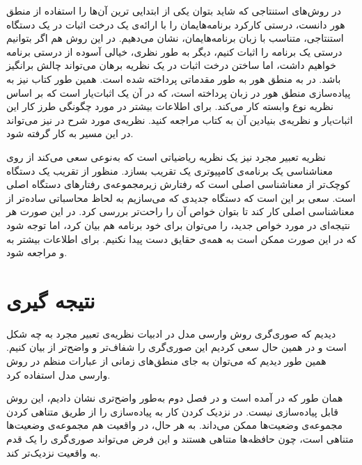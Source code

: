 \documentclass[12pt]{report}
\begin{document}
در روش‌های استنتاجی که شاید بتوان یکی از ابتدایی ترین آن‌ها را استفاده از منطق هور\cite{hoare} دانست، درستی کارکرد برنامه‌هایمان را با ارائه‌ی یک درخت اثبات در یک دستگاه استنتاجی، متناسب با زبان برنامه‌هایمان، نشان می‌‌دهیم. در این روش هم اگر بتوانیم درستی یک برنامه را اثبات کنیم، دیگر به‌ طور نظری، خیالی آسوده از درستی برنامه خواهیم داشت، اما ساختن درخت اثبات در یک نظریه برهان می‌تواند چالش بر‌انگیز باشد. در\cite{logicincs} به منطق هور به طور مقدماتی پرداخته شده است. همین ‌طور کتاب\cite{softwarefoundations} نیز به پیاده‌سازی منطق هور در زبان  پرداخته است، که در آن  یک اثبات‌یار است که بر اساس نظریه نوع وابسته کار می‌کند. برای اطلاعات بیشتر در مورد چگونگی طرز کار این اثبات‌یار و نظریه‌ی بنیادین آن به کتاب\cite{chlipala} مراجعه‌ کنید. نظریه‌ی مورد شرح در\cite{dynamic} نیز می‌تواند در این مسیر به کار گرفته شود.

نظریه تعبیر مجرد\cite{cousot1} نیز یک نظریه ریاضیاتی است که به‌نوعی سعی می‌کند از روی معناشناسی یک برنامه‌ی کامپیوتری\cite{winskel} یک تقریب بسازد. منظور از تقریب یک دستگاه کوچک‌تر از معناشناسی اصلی است که رفتارش زیرمجموعه‌ی رفتارهای دستگاه اصلی است. سعی بر این است که دستگاه جدیدی که می‌سازیم به لحاظ محاسباتی ساده‌تر از معناشناسی اصلی کار کند تا بتوان خواص آن را راحت‌تر بررسی کرد. در این صورت هر نتیجه‌ای در مورد خواص جدید، را می‌توان برای خود برنامه هم بیان کرد، اما توجه شود که در این صورت ممکن است به همه‌ی حقایق دست پیدا نکنیم. برای اطلاعات بیشتر به \cite{cousotbook} و \cite{statica} مراجعه شود.



\tableofcontents







\chapter*{نتیجه گیری}
دیدیم که صوری‌گری روش وارسی مدل در ادبیات نظریه‌ی تعبیر مجرد به چه شکل است و در همین حال سعی کردیم این صوری‌گری را شفاف‌تر و واضح‌تر از \cite{calcul} بیان کنیم. همین طور دیدیم که می‌توان به‌ جای منطق‌های زمانی از عبارات منظم در روش وارسی مدل استفاده کرد.

همان طور که در \cite{calcul} آمده است و در فصل دوم به‌طور واضح‌تری نشان دادیم، این روش قابل پیاده‌سازی نیست. در \cite{calcul} نزدیک کردن کار به پیاده‌سازی را از طریق متناهی کردن مجموعه‌ی وضعیت‌ها ممکن می‌‌داند. به ‌هر حال، در واقعیت هم مجموعه‌ی وضعیت‌ها متناهی است، چون حافظه‌ها متناهی هستند و این فرض می‌تواند صوری‌گری را یک قدم به واقعیت نزدیک‌تر کند.
\end{document}
